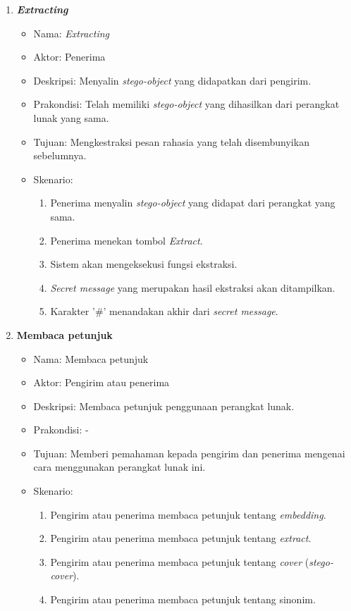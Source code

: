 \begin{enumerate}
	\item \textbf{\textit{Extracting}}
	\begin{itemize}
		\item Nama: \textit{Extracting}
		\item Aktor: Penerima
		\item Deskripsi: Menyalin \textit{stego-object} yang didapatkan dari pengirim.
		\item Prakondisi: Telah memiliki \textit{stego-object} yang dihasilkan dari perangkat lunak yang sama.
		\item Tujuan: Mengkestraksi pesan rahasia yang telah disembunyikan sebelumnya.
		\item Skenario:
			\begin{enumerate}
				\item Penerima menyalin \textit{stego-object} yang didapat dari perangkat yang sama.
				\item Penerima menekan tombol \textit{Extract}.
				\item Sistem akan mengeksekusi fungsi ekstraksi.
				\item \textit{Secret message} yang merupakan hasil ekstraksi akan ditampilkan.
				\item Karakter '$\#$' menandakan akhir dari \textit{secret message}.
			\end{enumerate}
	\end{itemize}
	
	\item \textbf{Membaca petunjuk}
	\begin{itemize}
		\item Nama: Membaca petunjuk
		\item Aktor: Pengirim atau penerima
		\item Deskripsi: Membaca petunjuk penggunaan perangkat lunak.
		\item Prakondisi: -
		\item Tujuan: Memberi pemahaman kepada pengirim dan penerima mengenai cara menggunakan perangkat lunak ini.
		\item Skenario:
			\begin{enumerate}
				\item Pengirim atau penerima membaca petunjuk tentang \textit{embedding}.
				\item Pengirim atau penerima membaca petunjuk tentang \textit{extract}.
				\item Pengirim atau penerima membaca petunjuk tentang \textit{cover} (\textit{stego-cover}).
				\item Pengirim atau penerima membaca petunjuk tentang sinonim.
			\end{enumerate}
	\end{itemize}
\end{enumerate}

